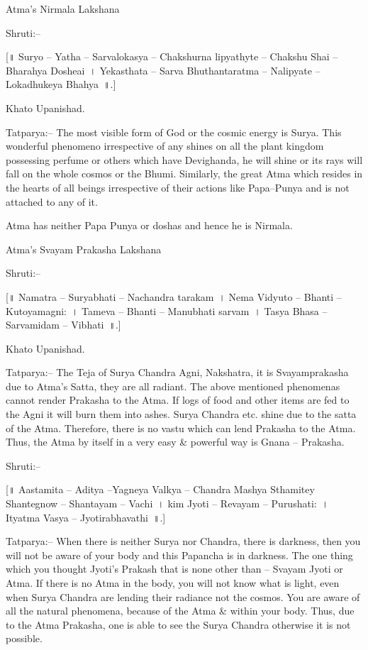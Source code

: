 Atma's Nirmala Lakshana

Shruti:–

[॥ Suryo – Yatha – Sarvalokasya – Chakshurna lipyathyte – Chakshu Shai – Bharahya Dosheai~। Yekasthata – Sarva Bhuthantaratma – Nalipyate – Lokadhukeya Bhahya~॥.]

Khato Upanishad.

Tatparya:– The most visible form of God or the cosmic energy is Surya. This wonderful phenomeno irrespective of any shines on all the plant kingdom possessing perfume or others which have Devighanda, he will shine or its rays will fall on the whole cosmos or the Bhumi. Similarly, the great Atma which resides in the hearts of all beings irrespective of their actions like Papa–Punya and is not attached to any of it.

Atma has neither Papa Punya or doshas and hence he is Nirmala.

Atma's Svayam Prakasha Lakshana

Shruti:–

[॥ Namatra – Suryabhati – Nachandra tarakam~। Nema Vidyuto – Bhanti – Kutoyamagni:~। Tameva – Bhanti – Manubhati sarvam~। Tasya Bhasa – Sarvamidam – Vibhati~॥.]

Khato Upanishad.

Tatparya:– The Teja of Surya Chandra Agni, Nakshatra, it is Svayamprakasha due to Atma's Satta, they are all radiant. The above mentioned phenomenas cannot render Prakasha to the Atma. If logs of food and other items are fed to the Agni it will burn them into ashes. Surya Chandra etc. shine due to the satta of the Atma. Therefore, there is no vastu which can lend Prakasha to the Atma. Thus, the Atma by itself in a very easy \& powerful way is Gnana – Prakasha.

Shruti:–

[॥ Aastamita – Aditya –Yagneya Valkya – Chandra Mashya Sthamitey Shantegnow – Shantayam – Vachi~। kim Jyoti – Revayam – Purushati:~। Ityatma Vasya – Jyotirabhavathi~॥.]

Tatparya:– When there is neither Surya nor Chandra, there is darkness, then you will not be aware of your body and this Papancha is in darkness. The one thing which you thought Jyoti's Prakash that is none other than – Svayam Jyoti or Atma. If there is no Atma in the body, you will not know what is light, even when Surya Chandra are lending their radiance not the cosmos. You are aware of all the natural phenomena, because of the Atma \& within your body. Thus, due to the Atma Prakasha, one is able to see the Surya Chandra otherwise it is not possible.

